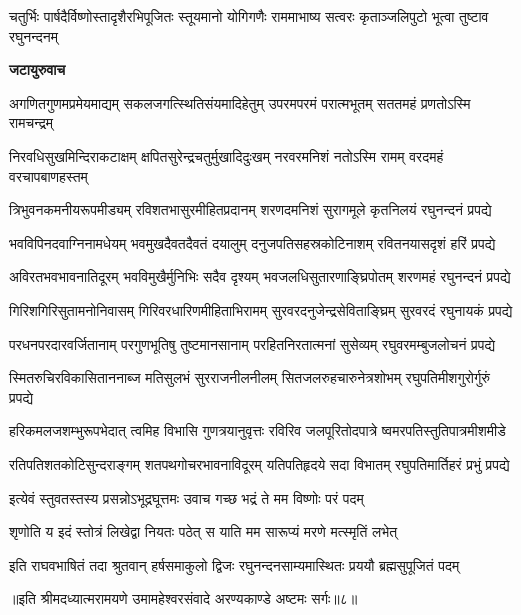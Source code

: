 \threelineshloka
{चतुर्भिः पार्षदैर्विष्णोस्तादृशैरभिपूजितः}
{स्तूयमानो योगिगणैः राममाभाष्य सत्वरः}
{कृताञ्जलिपुटो भूत्वा तुष्टाव रघुनन्दनम्} %

\textbf{जटायुरुवाच}

\fourlineindentedshloka
{अगणितगुणमप्रमेयमाद्यम्}
{सकलजगत्स्थितिसंयमादिहेतुम्}
{उपरमपरमं परात्मभूतम्}
{सततमहं प्रणतोऽस्मि रामचन्द्रम्} %

\fourlineindentedshloka
{निरवधिसुखमिन्दिराकटाक्षम्}
{क्षपितसुरेन्द्रचतुर्मुखादिदुःखम्}
{नरवरमनिशं नतोऽस्मि रामम्}
{वरदमहं वरचापबाणहस्तम्} %

\fourlineindentedshloka
{त्रिभुवनकमनीयरूपमीड्यम्}
{रविशतभासुरमीहितप्रदानम्}
{शरणदमनिशं सुरागमूले}
{कृतनिलयं रघुनन्दनं प्रपद्ये} %

\fourlineindentedshloka
{भवविपिनदवाग्निनामधेयम्}
{भवमुखदैवतदैवतं दयालुम्}
{दनुजपतिसहस्रकोटिनाशम्}
{रवितनयासदृशं हरिं प्रपद्ये} %

\fourlineindentedshloka
{अविरतभवभावनातिदूरम्}
{भवविमुखैर्मुनिभिः सदैव दृश्यम्}
{भवजलधिसुतारणाङ्घ्रिपोतम्}
{शरणमहं रघुनन्दनं प्रपद्ये} %

\fourlineindentedshloka
{गिरिशगिरिसुतामनोनिवासम्}
{गिरिवरधारिणमीहिताभिरामम्}
{सुरवरदनुजेन्द्रसेविताङ्घ्रिम्}
{सुरवरदं रघुनायकं प्रपद्ये} %

\fourlineindentedshloka
{परधनपरदारवर्जितानाम्}
{परगुणभूतिषु तुष्टमानसानाम्}
{परहितनिरतात्मनां सुसेव्यम्}
{रघुवरमम्बुजलोचनं प्रपद्ये} %

\fourlineindentedshloka
{स्मितरुचिरविकासिताननाब्ज\-}
{मतिसुलभं सुरराजनीलनीलम्}
{सितजलरुहचारुनेत्रशोभम्}
{रघुपतिमीशगुरोर्गुरुं प्रपद्ये} %

\fourlineindentedshloka
{हरिकमलजशम्भुरूपभेदात्\-}
{त्वमिह विभासि गुणत्रयानुवृत्तः}
{रविरिव जलपूरितोदपात्रे\-}
{ष्वमरपतिस्तुतिपात्रमीशमीडे} %

\fourlineindentedshloka
{रतिपतिशतकोटिसुन्दराङ्गम्}
{शतपथगोचरभावनाविदूरम्}
{यतिपतिहृदये सदा विभातम्}
{रघुपतिमार्तिहरं प्रभुं प्रपद्ये} %

\twolineshloka
{इत्येवं स्तुवतस्तस्य प्रसन्नोऽभूद्रघूत्तमः}
{उवाच गच्छ भद्रं ते मम विष्णोः परं पदम्} %

\twolineshloka
{शृणोति य इदं स्तोत्रं लिखेद्वा नियतः पठेत्}
{स याति मम सारूप्यं मरणे मत्स्मृतिं लभेत्} %

\fourlineindentedshloka
{इति राघवभाषितं तदा}
{श्रुतवान् हर्षसमाकुलो द्विजः}
{रघुनन्दनसाम्यमास्थितः}
{प्रययौ ब्रह्मसुपूजितं पदम्} %

{॥इति श्रीमदध्यात्मरामयणे उमामहेश्वरसंवादे
अरण्यकाण्डे अष्टमः सर्गः॥८॥
}



